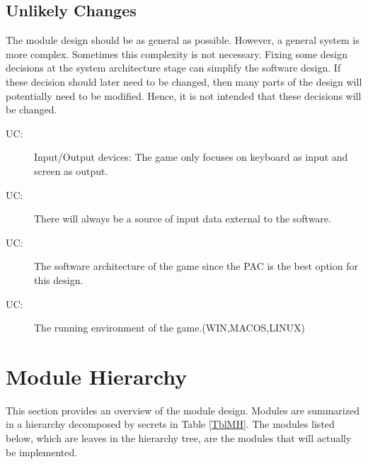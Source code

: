 \documentclass[12pt]{article}
\newcounter{ucnum}
\newcommand{\uctheucnum}{UC\theucnum}
\begin{document}
\subsection{Unlikely Changes} \label{SecUchange}

The module design should be as general as possible. However, a general system is
more complex. Sometimes this complexity is not necessary. Fixing some design
decisions at the system architecture stage can simplify the software design. If
these decision should later need to be changed, then many parts of the design
will potentially need to be modified. Hence, it is not intended that these
decisions will be changed.

\begin{description}
\item[ \uctheucnum :] Input/Output devices: The game only focuses on keyboard as input and screen as output.
\item[ \uctheucnum :] There will always be
  a source of input data external to the software.
\item[ \uctheucnum :] The software architecture of the game since the PAC is the best option for this design.
\item[ \uctheucnum :] The running environment of the game.(WIN,MACOS,LINUX)
\end{description}

\section{Module Hierarchy} \label{SecMH}
This section provides an overview of the module design. Modules are summarized in a hierarchy decomposed by secrets in Table \ref{TblMH}. The modules listed below, which are leaves in the hierarchy tree, are the modules that will actually be implemented.
\end{document}
